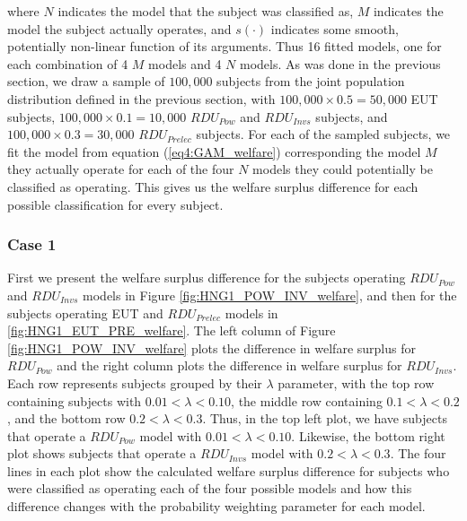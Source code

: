 \documentclass[../main.tex]{subfiles}
\begin{document}
\noindent where $N$ indicates the model that the subject was classified as, $M$ indicates the model the subject actually operates, and $s(\cdot)$ indicates some smooth, potentially non-linear function of its arguments.
Thus 16 fitted models, one for each combination of 4 $M$ models and 4 $N$ models.
As was done in the previous section, we draw a sample of $100,000$ subjects from the joint population distribution defined in the previous section, with $100,000 \times 0.5 = 50,000$ EUT subjects, $100,000 \times 0.1 = 10,000$ $\mathit{RDU_{Pow}}$ and $\mathit{RDU_{Invs}}$ subjects, and $100,000 \times 0.3 = 30,000$ $\mathit{RDU_{Prelec}}$ subjects.
For each of the sampled subjects, we fit the model from equation (\ref{eq4:GAM_welfare}) corresponding the model $M$ they actually operate for each of the four $N$ models they could potentially be classified as operating.
This gives us the welfare surplus difference for each possible classification for every subject.

\subsubsection{Case 1}

First we present the welfare surplus difference for the subjects operating $\mathit{RDU_{Pow}}$ and $\mathit{RDU_{Invs}}$ models in Figure \ref{fig:HNG1_POW_INV_welfare}, and then for the subjects operating EUT and $\mathit{RDU_{Prelec}}$ models in \ref{fig:HNG1_EUT_PRE_welfare}.
The left column of Figure \ref{fig:HNG1_POW_INV_welfare} plots the difference in welfare surplus for $\mathit{RDU_{Pow}}$ and the right column plots the difference in welfare surplus for $\mathit{RDU_{Invs}}$.
Each row represents subjects grouped by their $\lambda$ parameter, with the top row containing subjects with $0.01 < \lambda < 0.10$, the middle row containing $0.1 < \lambda < 0.2$, and the bottom row $0.2 < \lambda < 0.3$.
Thus, in the top left plot, we have subjects that operate a $\mathit{RDU_{Pow}}$ model with $0.01 < \lambda < 0.10$.
Likewise, the bottom right plot shows subjects that operate a $\mathit{RDU_{Invs}}$ model with $0.2 < \lambda < 0.3$.
The four lines in each plot show the calculated welfare surplus difference for subjects who were classified as operating each of the four possible models and how this difference changes with the probability weighting parameter for each model.
\end{document}
